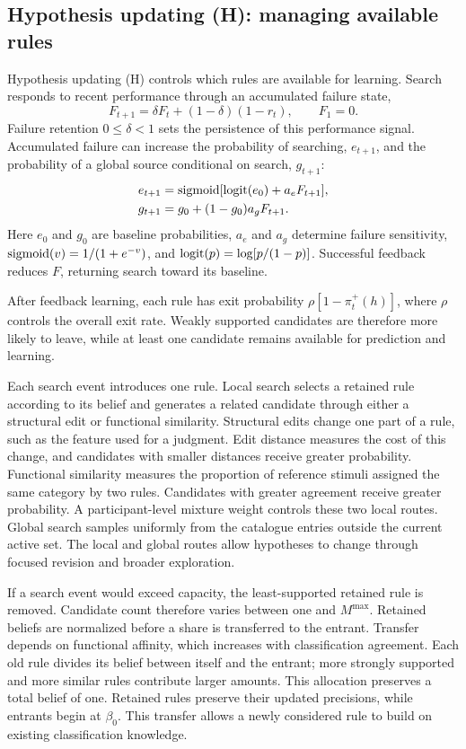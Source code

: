 \subsection*{Hypothesis updating (H): managing available rules}
\label{m:hypothesis}

Hypothesis updating (H) controls which rules are available for learning. Search responds to recent performance through an accumulated failure state,
\begin{equation}
F_{t+1}=\delta F_t+(1-\delta)(1-r_t),\qquad F_1=0.
\label{eq:failure-accumulator}
\end{equation}
Failure retention $0\leq\delta<1$ sets the persistence of this performance signal. Accumulated failure can increase the probability of searching, $e_{t+1}$, and the probability of a global source conditional on search, $g_{t+1}$:
\begin{align}
e_{t+1}&=\operatorname{sigmoid}[\operatorname{logit}(e_0)+a_eF_{t+1}],\\
g_{t+1}&=g_0+(1-g_0)a_gF_{t+1}.
\label{eq:search-control}
\end{align}
Here $e_0$ and $g_0$ are baseline probabilities, $a_e$ and $a_g$ determine failure sensitivity, $\operatorname{sigmoid}(v)=1/(1+e^{-v})$, and $\operatorname{logit}(p)=\log[p/(1-p)]$. Successful feedback reduces $F$, returning search toward its baseline.

After feedback learning, each rule has exit probability $\rho[1-\pi_t^+(h)]$, where $\rho$ controls the overall exit rate. Weakly supported candidates are therefore more likely to leave, while at least one candidate remains available for prediction and learning.

\label{m:proposals}
Each search event introduces one rule. Local search selects a retained rule according to its belief and generates a related candidate through either a structural edit or functional similarity. Structural edits change one part of a rule, such as the feature used for a judgment. Edit distance measures the cost of this change, and candidates with smaller distances receive greater probability. Functional similarity measures the proportion of reference stimuli assigned the same category by two rules. Candidates with greater agreement receive greater probability. A participant-level mixture weight controls these two local routes. Global search samples uniformly from the catalogue entries outside the current active set. The local and global routes allow hypotheses to change through focused revision and broader exploration.

\label{m:transfer}
If a search event would exceed capacity, the least-supported retained rule is removed. Candidate count therefore varies between one and $M^{\max}$. Retained beliefs are normalized before a share is transferred to the entrant. Transfer depends on functional affinity, which increases with classification agreement. Each old rule divides its belief between itself and the entrant; more strongly supported and more similar rules contribute larger amounts. This allocation preserves a total belief of one. Retained rules preserve their updated precisions, while entrants begin at $\beta_0$. This transfer allows a newly considered rule to build on existing classification knowledge.

